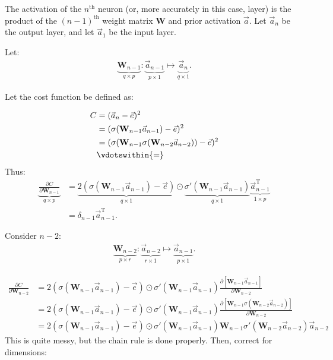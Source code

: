 \usepackage{amsmath}
The activation of the $n^{\text{th}}$ neuron (or, more accurately in this case, layer) is the product of the ${(n-1)}^{\text{th}}$ weight matrix $\mathbf{W}$ and prior activation $\vec{a}.$ Let $\vec{a}_n$ be the output layer, and let $\vec{a}_1$ be the input layer.

Let:
\begin{align*}
\underbrace{\mathbf{W}_{n-1}}_{q \times p}: \underbrace{\vec{a}_{n-1}}_{p \times 1} \mapsto \underbrace{\vec{a}_{n}}_{q \times 1}.
\end{align*}

Let the cost function be defined as:

\begin{align*}
C&=(\vec{a}_n-\vec{e})^2 \\
&=(\sigma(\mathbf{W}_{n-1}\vec{a}_{n-1}) - \vec{e})^2 \\
&=(\sigma(\mathbf{W}_{n-1} \sigma(\mathbf{W}_{n-2}\vec{a}_{n-2}) ) - \vec{e})^2 \\
&\vdotswithin{=}
\end{align*}
Thus:
\begin{align*}
\underbrace{\frac{\partial C}{\partial \mathbf{W}_{n-1}}}_{q \times p}
&=
\underbrace{2(\sigma(\mathbf{W}_{n-1}\vec{a}_{n-1})-\vec{e})}_{q \times 1} \odot 
\underbrace{\sigma'(\mathbf{W}_{n-1}\vec{a}_{n-1})}_{q \times 1}
\underbrace{\vec{a}_{n-1}^{\text{T}}}_{1 \times p} \\
&=\delta_{n-1}\vec{a}_{n-1}^{\text{T}}.
\end{align*}

Consider $n-2$:
\begin{align*}
\underbrace{\mathbf{W}_{n-2}}_{p \times r}: \underbrace{\vec{a}_{n-2}}_{r \times 1} \mapsto \underbrace{\vec{a}_{n-1}}_{p \times 1}.
\end{align*}

\begin{align*}
\frac{\partial C}{\partial \mathbf{W}_{n-2}}
&=
2(\sigma(\mathbf{W}_{n-1}\vec{a}_{n-1})-\vec{e}) \odot 
\sigma'(\mathbf{W}_{n-1}\vec{a}_{n-1})
\frac{\partial \left[ \mathbf{W}_{n-1}\vec{a}_{n-1} \right]}{\partial \mathbf{W}_{n-2}} \\
&=
2(\sigma(\mathbf{W}_{n-1}\vec{a}_{n-1})-\vec{e}) \odot 
\sigma'(\mathbf{W}_{n-1}\vec{a}_{n-1})
\frac{\partial[\mathbf{W}_{n-1}\sigma(\mathbf{W}_{n-2}\vec{a}_{n-2})]}{\partial\mathbf{W}_{n-2}} \\
&=
2(\sigma(\mathbf{W}_{n-1}\vec{a}_{n-1})-\vec{e}) \odot 
\sigma'(\mathbf{W}_{n-1}\vec{a}_{n-1})
\mathbf{W}_{n-1}
\sigma'(\mathbf{W}_{n-2}\vec{a}_{n-2})
\vec{a}_{n-2}
\end{align*}
This is quite messy, but the chain rule is done properly. Then, correct for dimensions:

